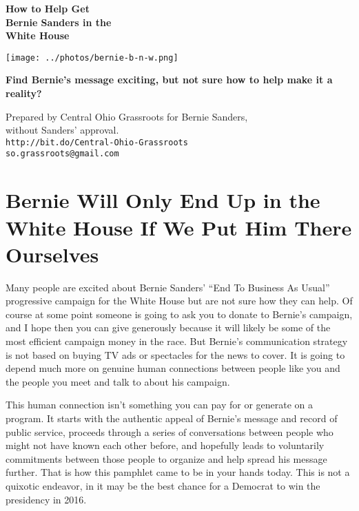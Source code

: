 \documentclass[notumble]{leaflet}
\begin{document}
\begin{center}
{\huge\bf How to Help Get \\
Bernie Sanders in the \\
\vspace{10pt}
White House}

\texttt{[image: ../photos/bernie-b-n-w.png]}

{\large\bf Find Bernie's message exciting, but not sure how to help make it a reality?}

\vfill

{\tiny Prepared by Central Ohio Grassroots for Bernie Sanders,\\
  without Sanders' approval.\\
  {\tt http://bit.do/Central-Ohio-Grassroots\\
    so.grassroots@gmail.com}}

\end{center}

\pagebreak

\section*{Bernie Will Only End Up in the White House If We Put Him There Ourselves}

Many people are excited about Bernie Sanders' ``End To Business As
Usual'' progressive campaign for the White House but are not sure how
they can help.  Of course at some point someone is going to ask you to
donate to Bernie's campaign, and I hope then you can give generously
because it will likely be some of the most efficient campaign
money in the race.  But Bernie's communication strategy is not
based on buying TV ads or spectacles for the news to cover.  It is
going to depend much more on genuine human connections between people
like you and the people you meet and talk to about his campaign.

This human connection isn't something you can pay for or generate on a
program.  It starts with the authentic appeal of Bernie's message and
record of public service, proceeds through a series of conversations
between people who might not have known each other before, and
hopefully leads to voluntarily commitments between those people to
organize and help spread his message further. That is how this
pamphlet came to be in your hands today.  This is not a quixotic
endeavor, in it may be the best chance for a Democrat to win the
presidency in 2016.
\end{document}
